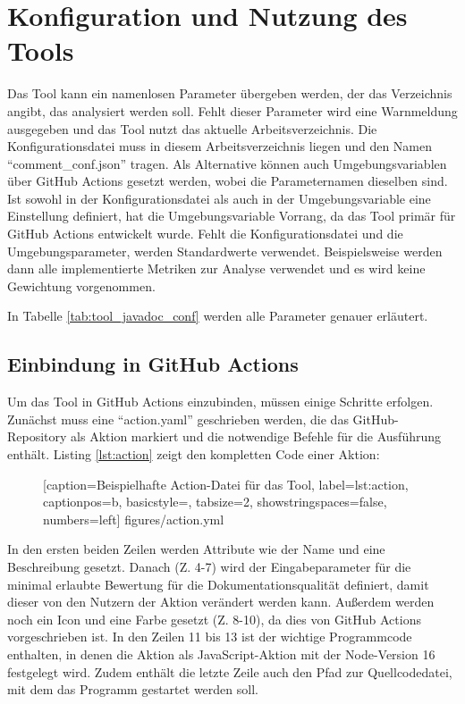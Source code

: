 \section{Konfiguration und Nutzung des Tools}
Das Tool kann ein namenlosen Parameter übergeben werden, der das Verzeichnis angibt, das analysiert werden soll. Fehlt dieser Parameter wird eine Warnmeldung ausgegeben und das Tool nutzt das aktuelle Arbeitsverzeichnis. Die Konfigurationsdatei muss in diesem Arbeitsverzeichnis liegen und den Namen \enquote{comment\_conf.json} tragen. Als Alternative können auch Umgebungsvariablen über GitHub Actions gesetzt werden, wobei die Parameternamen dieselben sind. Ist sowohl in der Konfigurationsdatei als auch in der Umgebungsvariable eine Einstellung definiert, hat die Umgebungsvariable Vorrang, da das Tool primär für GitHub Actions entwickelt wurde. Fehlt die Konfigurationsdatei und die Umgebungsparameter, werden Standardwerte verwendet. Beispielsweise werden dann alle implementierte Metriken zur Analyse verwendet und es wird keine Gewichtung vorgenommen.

In Tabelle \ref{tab:tool_javadoc_conf} werden alle Parameter genauer erläutert.


\subsection{Einbindung in GitHub Actions}\label{chapter:github_actions_impl}
Um das Tool in GitHub Actions einzubinden, müssen einige Schritte erfolgen. Zunächst muss eine \enquote{action.yaml} geschrieben werden, die das GitHub-Repository als Aktion markiert und die notwendige Befehle für die Ausführung enthält. Listing  \ref{lst:action} zeigt den kompletten Code einer Aktion:
\begin{figure} [htbp]

[caption={Beispielhafte Action-Datei für das Tool},
label={lst:action},
captionpos=b, basicstyle=\footnotesize, tabsize=2, showstringspaces=false,  numbers=left]
{figures/action.yml}
\end{figure}

In den ersten beiden Zeilen werden Attribute wie der Name und eine Beschreibung gesetzt. Danach (Z. 4-7) wird der Eingabeparameter für die minimal erlaubte Bewertung für die Dokumentationsqualität definiert, damit dieser von den Nutzern der Aktion verändert werden kann.  Außerdem werden noch ein Icon und eine Farbe gesetzt (Z. 8-10), da dies von GitHub Actions vorgeschrieben ist. In den Zeilen 11 bis 13 ist der wichtige Programmcode enthalten, in denen die Aktion als JavaScript-Aktion mit der Node-Version 16 festgelegt wird. Zudem enthält die letzte Zeile auch den Pfad zur Quellcodedatei, mit dem das Programm gestartet werden soll. 

